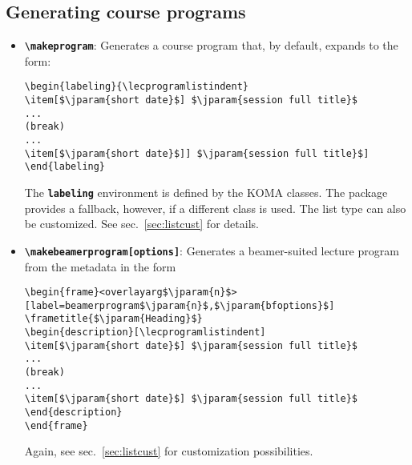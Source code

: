 \documentclass[english]{article}
\newcommand*\jmacro[1]{\textbf{\texttt{#1}}}
\newcommand*\jcsmacro[1]{\jmacro{\textbackslash{#1}}}
\newcommand*\jparam[1]{\angus #1\angud}
\begin{document}
\subsection{Generating course programs}\label{subsec:genprog}
\label{sec:lecprog}
\begin{itemize}
\item \jcsmacro{makeprogram}: Generates a course program that, by default,
expands to the form:
\begin{lstlisting}[language={[LaTeX]TeX},basicstyle={\small\ttfamily},
                   frame=single,escapechar=\$]
\begin{labeling}{\lecprogramlistindent}
\item[$\jparam{short date}$] $\jparam{session full title}$
...
(break)
...
\item[$\jparam{short date}$]] $\jparam{session full title}$]
\end{labeling}
\end{lstlisting}

The \jmacro{labeling} environment is defined by the KOMA classes.
The package provides a fallback, however, if a different class is used.
The list type can also be customized. See sec.~\ref{sec:listcust} for details.

\item \jcsmacro{makebeamerprogram[\jparam{options}]}: Generates
a beamer-suited lecture program from the metadata in the form
\begin{lstlisting}[language={[LaTeX]TeX},basicstyle={\small\ttfamily},
                   frame=single,escapechar=\$,moretexcs={[1]{frametitle}}]
\begin{frame}<overlayarg$\jparam{n}$>[label=beamerprogram$\jparam{n}$,$\jparam{bfoptions}$]
\frametitle{$\jparam{Heading}$}
\begin{description}[\lecprogramlistindent]
\item[$\jparam{short date}$] $\jparam{session full title}$
...
(break)
...
\item[$\jparam{short date}$] $\jparam{session full title}$
\end{description}
\end{frame}
\end{lstlisting}

Again, see sec.~\ref{sec:listcust} for customization possibilities.


\end{itemize}
\end{document}
